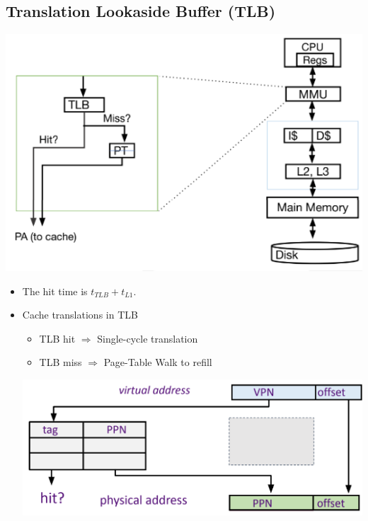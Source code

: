 \documentclass[10pt]{article}
\begin{document}
\subsection*{Translation Lookaside Buffer (TLB)}
\begin{center}
    \includegraphics*[scale=0.9]{W7_15.png}
\end{center}
\begin{itemize}
    \item The hit time is $t_{TLB} + t_{L1}$.
    \item Cache translations in TLB
    \begin{itemize}
        \item TLB hit $\Rightarrow$ Single-cycle translation
        \item TLB miss $\Rightarrow$ Page-Table Walk to refill
    \end{itemize}
    \begin{center}
        \includegraphics*[scale=0.8]{W7_16.png}
    \end{center}
\end{itemize}
\end{document}
